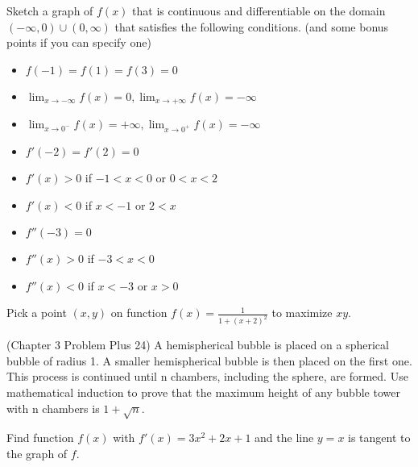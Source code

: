 \documentclass[Calculus 1 Recitation.tex]{subfiles}
\begin{document}
\begin{myleftlinebox}
	Sketch a graph of $f(x)$ that is continuous and differentiable on the domain $(-\infty,0)\cup (0,\infty)$ that satisfies the following conditions. (and some bonus points if you can specify one)
	\begin{itemize}
		\item $f(-1)=f(1)=f(3)=0$
		\item $\displaystyle \lim_{x\to-\infty}f(x)=0, \lim_{x\to+\infty}f(x)=-\infty$
		\item $\displaystyle \lim_{x\to 0^-}f(x)=+\infty, \lim_{x\to 0^+}f(x)=-\infty$
		\item $f'(-2)=f'(2)=0$
		\item $f'(x)>0$ if $-1<x<0$ or $0<x<2$
		\item $f'(x)<0$ if $x<-1$ or $2<x$
		\item $f''(-3)=0$
		\item $f''(x)>0$ if $-3<x<0$
		\item $f''(x)<0$ if $x<-3$ or $x>0$
	\end{itemize}
	\tcblower
\end{myleftlinebox}

\begin{myleftlinebox}
	Pick a point $(x,y)$ on function $f(x)=\frac{1}{1+(x+2)^2}$ to maximize $xy$.
	\tcblower
\end{myleftlinebox}

\begin{myleftlinebox}
	(Chapter 3 Problem Plus 24) A hemispherical bubble is placed on a spherical bubble of radius 1. A smaller hemispherical bubble is then placed on the first one. This process is continued until n chambers, including the sphere, are formed. Use mathematical induction to prove that the maximum height of any bubble tower with n chambers is $1+\sqrt{n}$.
	\tcblower
\end{myleftlinebox}

\begin{myleftlinebox}
	Find function $f(x)$ with $f'(x)=3x^2+2x+1$ and the line $y=x$ is tangent to the graph of $f$.
	\tcblower
\end{myleftlinebox}
\end{document}
